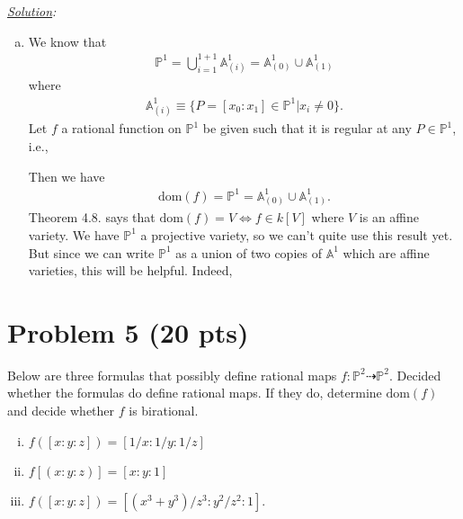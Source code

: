 \documentclass[12pt]{article}
\newcommand{\A}{\mathbb{A}}
\begin{document}
\noindent \textit{\underline{Solution}:}

\begin{enumerate}[(a)]
	\item We know that 
	\begin{align*}
	\mathbb{P}^1 = \bigcup^{1+1}_{i=1}\A^1_{(i)} = \A^1_{(0)} \cup \A^1_{(1)}
	\end{align*}
	where
	\begin{align*}
	\A^1_{(i)} \equiv \{ P= [x_0 : x_1] \in \mathbb{P}^1 \vert x_i \neq 0 \}.
	\end{align*}
	Let $f$ a rational function on $\mathbb{P}^1$ be given such that it is regular at any $P\in \mathbb{P}^1$, i.e., 
	
	
	
	Then we have
	\begin{align*}
	\mbox{dom}(f) = \mathbb{P}^1 = \A_{(0)}^1 \cup \A_{(1)}^1.
	\end{align*}
	Theorem 4.8. says that $\mbox{dom}(f) = V \iff f \in k[V]$ where $V$ is an affine variety. We have $\mathbb{P}^1$ a projective variety, so we can't quite use this result yet. But since we can write $\mathbb{P}^1$ as a union of two copies of $\A^1$ which are affine varieties, this will be helpful. Indeed,    
	
	
	
	
	
	
\end{enumerate}


















\newpage





\section*{Problem 5 \small{(20 pts)}} 
Below are three formulas that possibly define rational maps $f: \mathbb{P}^2 \dashrightarrow \mathbb{P}^2$. Decided whether the formulas do define rational maps. If they do, determine $\mbox{dom}(f)$ and decide whether $f$ is birational. 
\begin{enumerate}[(i)]
	\item $f([x:y:z]) = [1/x:1/y:1/z]$
	\item $f[(x:y:z)] = [x:y:1]$
	\item $f([x:y:z]) = [(x^3+y^3)/z^3 : y^2/z^2 : 1]$.
\end{enumerate}
\end{document}
